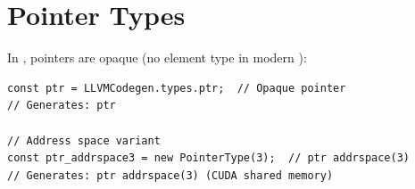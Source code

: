 \section{Pointer Types}

In  , pointers are opaque (no element type in modern ):

\begin{lstlisting}[style=ts]
const ptr = LLVMCodegen.types.ptr;  // Opaque pointer
// Generates: ptr

// Address space variant
const ptr_addrspace3 = new PointerType(3);  // ptr addrspace(3)
// Generates: ptr addrspace(3) (CUDA shared memory)
\end{lstlisting}

